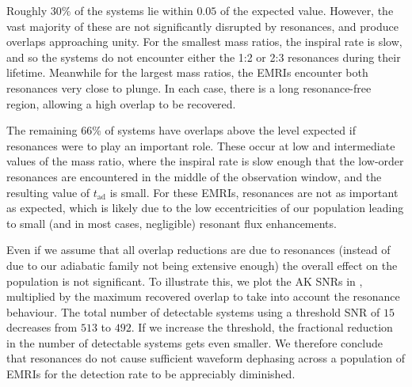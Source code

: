 Roughly $30\%$ of the systems lie within $0.05$ of the expected value. However, the vast majority of these are not significantly disrupted by resonances, and produce overlaps approaching unity. For the smallest mass ratios, the inspiral rate is slow, and so the systems do not encounter either the 1:2 or 2:3 resonances during their lifetime. Meanwhile for the largest mass ratios, the EMRIs encounter both resonances very close to plunge. In each case, there is a long resonance-free region, allowing a high overlap to be recovered.

The remaining $66\%$ of systems have overlaps above the level expected if resonances were to play an important role. These occur at low and intermediate values of the mass ratio, where the inspiral rate is slow enough that the low-order resonances are encountered in the middle of the observation window, and the resulting value of $t_\mathrm{ad}$ is small. For these EMRIs, resonances are not as important as expected, which is likely due to the low eccentricities of our population leading to small (and in most cases, negligible) resonant flux enhancements.

Even if we assume that all overlap reductions are due to resonances (instead of due to our adiabatic family not being extensive enough) the overall effect on the population is not significant. To illustrate this, we plot the AK SNRs in , multiplied by the maximum recovered overlap to take into account the resonance behaviour. The total number of detectable systems using a threshold SNR of $15$ decreases from $513$ to $492$. If we increase the threshold, the fractional reduction in the number of detectable systems gets even smaller. We therefore conclude that resonances do not cause sufficient waveform dephasing across a population of EMRIs for the detection rate to be appreciably diminished.



